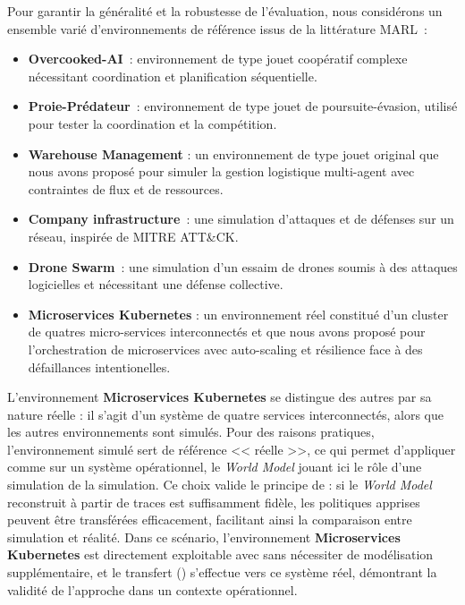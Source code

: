 Pour garantir la généralité et la robustesse de l’évaluation, nous considérons un ensemble varié d’environnements de référence issus de la littérature MARL~:
\begin{itemize}
  \item \textbf{Overcooked-AI}~\cite{overcookedai}: environnement de type jouet coopératif complexe nécessitant coordination et planification séquentielle.
  \item \textbf{Proie-Prédateur}~\cite{lowe2017multi}: environnement  de type jouet de poursuite-évasion, utilisé pour tester la coordination et la compétition.
  \item \textbf{Warehouse Management} : un environnement  de type jouet original que nous avons proposé pour simuler la gestion logistique multi-agent avec contraintes de flux et de ressources.
  \item \textbf{Company infrastructure}~\cite{cyberbattlesim}: une simulation d’attaques et de défenses sur un réseau, inspirée de MITRE ATT\&CK.
  \item \textbf{Drone Swarm}~\cite{cage_challenge_3_announcement}: une simulation d'un essaim de drones soumis à des attaques logicielles et nécessitant une défense collective.
  \item \textbf{Microservices Kubernetes} : un environnement réel constitué d'un cluster de quatres micro-services interconnectés et que nous avons proposé pour l'orchestration de microservices avec auto-scaling et résilience face à des défaillances intentionelles.
\end{itemize}

L’environnement \textbf{Microservices Kubernetes} se distingue des autres par sa nature réelle : il s’agit d’un système de quatre services interconnectés, alors que les autres environnements sont simulés. Pour des raisons pratiques, l’environnement simulé sert de référence << réelle >>, ce qui permet d’appliquer  comme sur un système opérationnel, le \textit{World Model} jouant ici le rôle d’une simulation de la simulation. Ce choix valide le principe de  : si le \textit{World Model} reconstruit à partir de traces est suffisamment fidèle, les politiques apprises peuvent être transférées efficacement, facilitant ainsi la comparaison entre simulation et réalité. Dans ce scénario, l’environnement \textbf{Microservices Kubernetes} est directement exploitable avec  sans nécessiter de modélisation supplémentaire, et le transfert () s’effectue vers ce système réel, démontrant la validité de l’approche dans un contexte opérationnel.


